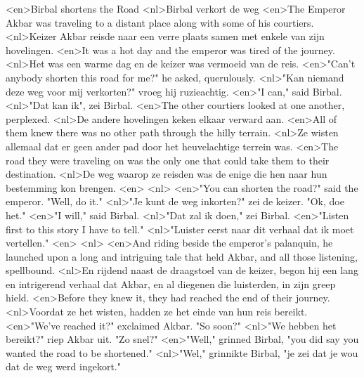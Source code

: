 <en>Birbal shortens the  Road
<nl>Birbal verkort de weg
<en>The Emperor Akbar was traveling to a distant place along with some of his courtiers.
<nl>Keizer Akbar reisde naar een verre plaats samen met enkele van zijn hovelingen.
<en>It was a hot day and the emperor was tired of the journey.
<nl>Het was een warme dag en de keizer was vermoeid van de reis.
<en>"Can’t anybody shorten this road for me?" he asked, querulously.
<nl>"Kan niemand deze weg voor mij verkorten?" vroeg hij ruzieachtig.
<en>"I can," said Birbal.
<nl>"Dat kan ik", zei Birbal.
<en>The other courtiers looked at one another, perplexed.
<nl>De andere hovelingen keken elkaar verward aan.
<en>All of them knew there was no other path through the hilly terrain.
<nl>Ze wisten allemaal dat er geen ander pad door het heuvelachtige terrein was.
<en>The road they were traveling on was the only one that could take them to their destination.
<nl>De weg waarop ze reisden was de enige die hen naar hun bestemming kon brengen.
<en>
<nl>
<en>"You can shorten the road?" said the emperor. "Well, do it."
<nl>"Je kunt de weg inkorten?" zei de keizer. "Ok, doe het."
<en>"I will," said Birbal.
<nl>"Dat zal ik doen," zei Birbal.
<en>"Listen first to this story I have to tell."
<nl>"Luister eerst naar dit verhaal dat ik moet vertellen."
<en>
<nl>
<en>And riding beside the emperor’s palanquin, he launched upon a long and intriguing tale that held Akbar,  and all those listening, spellbound.
<nl>En rijdend naast de draagstoel van de keizer, begon hij een lang en intrigerend verhaal dat Akbar, en al diegenen die luisterden, in zijn greep hield.
<en>Before they knew it, they had reached the end of their journey.
<nl>Voordat ze het wisten, hadden ze het einde van hun reis bereikt.
<en>"We’ve reached it?" exclaimed Akbar. "So soon?"
<nl>"We hebben het bereikt?" riep Akbar uit. "Zo snel?"
<en>"Well," grinned Birbal, "you did say you wanted the road to be shortened."
<nl>"Wel," grinnikte Birbal, "je zei dat je wou dat de weg werd ingekort."
